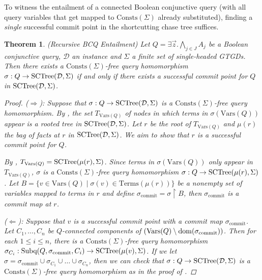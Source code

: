 \documentclass[12pt]{report}
\theoremstyle{plain}
\newtheorem{theorem}{Theorem}[chapter]
\theoremstyle{definition}
\def\Vars{{\mathrm{Vars}}}
\def\Consts{{\mathrm{Consts}}}
\def\Terms{{\mathrm{Terms}}}
\newcommand{\dom}[1]{\ensuremath{\normalfont{\operatorname{dom}}\!\left( #1 \right)}}
\newcommand{\SCTree}[2]{\ensuremath{\normalfont{\textrm{SCTree}}\!\left( #1, #2 \right)}}
\newcommand{\Subq}[3]{\ensuremath{\normalfont{\textrm{Subq}}\!\left( #1, #2, #3 \right)}}
\begin{document}
To witness the entailment of a connected Boolean conjunctive query (with all query variables that get mapped to $\Consts(\Sigma)$ already substituted), finding a \emph{single} successful commit point in the shortcutting chase tree suffices.

\begin{theorem}(Recursive BCQ Entailment)
\label{theorem:recursive-connected-bcq-entailment}
  Let $Q = \exists \vec{z}. \bigwedge_{j \in J} A_j$ be a Boolean conjunctive query, $\mathcal{D}$ an instance and $\Sigma$ a finite set of single-headed GTGDs. Then there exists a $\Consts(\Sigma)$-free query homomorphism $\sigma: Q \rightarrow \SCTree{\mathcal{D}}{\Sigma}$ if and only if there exists a successful commit point for $Q$ in $\SCTree{\mathcal{D}}{\Sigma}$.
  \begin{proof}
    ($\Longrightarrow$): Suppose that $\sigma: Q \rightarrow \SCTree{\mathcal{D}}{\Sigma}$ is a $\Consts(\Sigma)$-free query homomorphism. By , the set $T_{\Vars(Q)}$ of nodes in which terms in $\sigma(\Vars(Q))$ appear is a rooted tree in $\SCTree{\mathcal{D}}{\Sigma}$. Let $r$ be the root of $T_{\Vars(Q)}$ and $\mu(r)$ the bag of facts at $r$ in $\SCTree{\mathcal{D}}{\Sigma}$. We aim to show that $r$ is a successful commit point for $Q$.

    By , $T_{\Vars(Q)} = \SCTree{\mu(r)}{\Sigma}$. Since terms in $\sigma(\Vars(Q))$ only appear in $T_{\Vars(Q)}$, $\sigma$ is a $\Consts(\Sigma)$-free query homomorphism $\sigma: Q \rightarrow \SCTree{\mu(r)}{\Sigma}$. Let $B = \{ v \in \Vars(Q) \mid \sigma(v) \in \Terms(\mu(r)) \}$ be a nonempty set of variables mapped to terms in $r$ and define $\sigma_{\mathrm{commit}} = \sigma \upharpoonright B$, then $\sigma_{\mathrm{commit}}$ is a commit map at $r$.

    ($\Longleftarrow$): Suppose that $v$ is a successful commit point with a commit map $\sigma_{\mathrm{commit}}$. Let $C_1, \ldots, C_n$ be $Q$-connected components of $(\Vars(Q) \setminus \dom{\sigma_{\mathrm{commit}}})$. Then for each $1 \leq i \leq n$, there is a $\Consts(\Sigma)$-free query homomorphism $\sigma_{C_i}: \Subq{Q}{\sigma_{\mathrm{commit}}}{C_i} \rightarrow \SCTree{\mu(v)}{\Sigma}$. If we let $\sigma = \sigma_{\mathrm{commit}} \cup \sigma_{C_1} \cup \ldots \cup \sigma_{C_n}$, then we can check that $\sigma: Q \rightarrow \SCTree{\mathcal{D}}{\Sigma}$ is a $\Consts(\Sigma)$-free query homomorphism as in the proof of .
  \end{proof}
\end{theorem}
\end{document}
